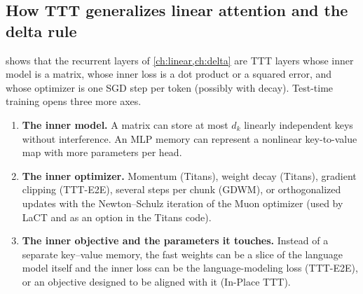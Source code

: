 \subsection{How TTT generalizes linear attention and the delta rule}\label{sec:c09-generalizes}

 shows that the recurrent layers of \cref{ch:linear,ch:delta} are TTT
layers whose inner model is a matrix, whose inner loss is a dot product or a squared error,
and whose optimizer is one SGD step per token (possibly with decay). Test-time training
opens three more axes.
\begin{enumerate}
  \item \textbf{The inner model.} A matrix can store at most $d_k$ linearly independent keys
        without interference. An MLP memory can represent a nonlinear key-to-value map with
        more parameters per head.
  \item \textbf{The inner optimizer.} Momentum (Titans), weight decay (Titans), gradient
        clipping (TTT-E2E), several steps per chunk (GDWM), or orthogonalized updates with the
        Newton--Schulz iteration of the Muon optimizer \citep{c01-jordan2024muon} (used by
        LaCT \citep{c09-zhang2025lact} and as an option in the Titans code).
  \item \textbf{The inner objective and the parameters it touches.} Instead of a separate
        key--value memory, the fast weights can be a slice of the language model itself and
        the inner loss can be the language-modeling loss (TTT-E2E), or an objective designed
        to be aligned with it (In-Place TTT).
\end{enumerate}

